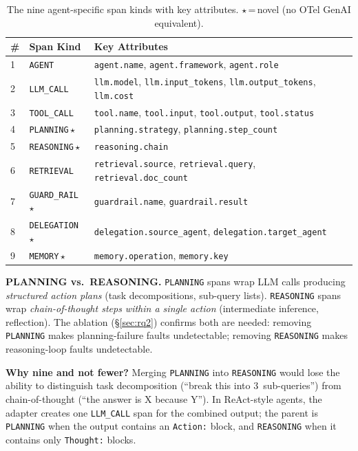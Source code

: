 \documentclass{article}
\begin{document}
\begin{table}[t]
\centering
\small
\caption{The nine agent-specific span kinds with key attributes.
$\star$\,=\,novel (no OTel GenAI equivalent).}
\label{tab:spantaxonomy}
\begin{tabular}{@{}llp{3.8cm}@{}}
\toprule
\textbf{\#} & \textbf{Span Kind} & \textbf{Key Attributes} \\
\midrule
1 & \texttt{AGENT}      & \texttt{agent.name}, \texttt{agent.framework}, \texttt{agent.role} \\
2 & \texttt{LLM\_CALL}  & \texttt{llm.model}, \texttt{llm.input\_tokens}, \texttt{llm.output\_tokens}, \texttt{llm.cost} \\
3 & \texttt{TOOL\_CALL} & \texttt{tool.name}, \texttt{tool.input}, \texttt{tool.output}, \texttt{tool.status} \\
4 & \texttt{PLANNING}\,$\star$   & \texttt{planning.strategy}, \texttt{planning.step\_count} \\
5 & \texttt{REASONING}\,$\star$  & \texttt{reasoning.chain} \\
6 & \texttt{RETRIEVAL}  & \texttt{retrieval.source}, \texttt{retrieval.query}, \texttt{retrieval.doc\_count} \\
7 & \texttt{GUARD\_RAIL}\,$\star$& \texttt{guardrail.name}, \texttt{guardrail.result} \\
8 & \texttt{DELEGATION}\,$\star$ & \texttt{delegation.source\_agent}, \texttt{delegation.target\_agent} \\
9 & \texttt{MEMORY}\,$\star$     & \texttt{memory.operation}, \texttt{memory.key} \\
\bottomrule
\end{tabular}
\end{table}

\textbf{PLANNING vs.\ REASONING.}
\texttt{PLANNING} spans wrap LLM calls producing \emph{structured
action plans} (task decompositions, sub-query lists).
\texttt{REASONING} spans wrap \emph{chain-of-thought steps within a
single action} (intermediate inference, reflection).  The ablation
(\S\ref{sec:rq2}) confirms both are needed: removing
\texttt{PLANNING} makes planning-failure faults undetectable; removing
\texttt{REASONING} makes reasoning-loop faults undetectable.

\textbf{Why nine and not fewer?}  Merging \texttt{PLANNING} into
\texttt{REASONING} would lose the ability to distinguish task
decomposition (``break this into 3~sub-queries'') from chain-of-thought
(``the answer is X because Y'').  In ReAct-style agents, the adapter
creates one \texttt{LLM\_CALL} span for the combined output; the parent
is \texttt{PLANNING} when the output contains an \texttt{Action:} block,
and \texttt{REASONING} when it contains only \texttt{Thought:} blocks.
\end{document}
